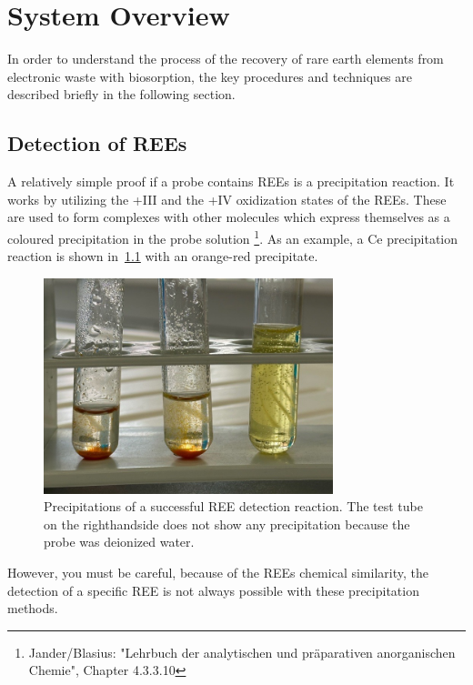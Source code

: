 \chapter{System Overview}

In order to understand the process of the recovery of rare earth elements from electronic waste with biosorption, the key procedures and techniques are described briefly in the following section.


\section{Detection of REEs\authorA}

A relatively simple proof if a probe contains REEs is a precipitation reaction.
It works by utilizing the +III and the +IV oxidization states of the REEs.
These are used to form complexes with other molecules which express themselves as a coloured precipitation in the probe solution \footnote{Jander/Blasius: "Lehrbuch der analytischen und präparativen anorganischen Chemie", Chapter 4.3.3.10}.
As an example, a Ce precipitation reaction is shown in~\ref{fig:cer_precipitation_cropped} with an orange-red precipitate.

\begin{figure}[H]
    \centering
    \includegraphics[width=0.75\textwidth]{./media/images/ree_precipitation_reaction_cropped}
    \caption{Precipitations of a successful REE detection reaction. The test tube on the righthandside does not show any precipitation because the probe was deionized water.}
    \label{fig:cer_precipitation_cropped}
\end{figure}

However, you must be careful, because of the REEs chemical similarity, the detection of a specific REE is not always possible with these precipitation methods.


